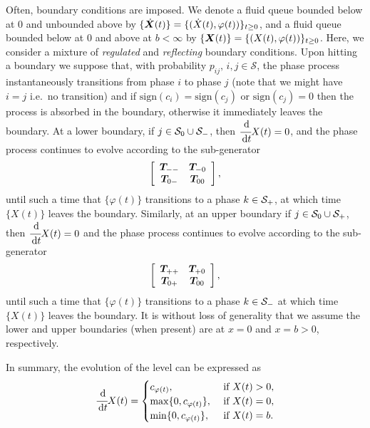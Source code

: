 Often, boundary conditions are imposed. We denote a fluid queue bounded below at \(0\) and unbounded above by \(\{\dot{\boldsymbol X}(t)\} = \{(\dot X(t),\varphi(t))\}_{t\geq0}\), and a fluid queue bounded below at \(0\) and above at \(b<\infty\) by \(\{{\boldsymbol X}(t)\} = \{( X(t),\varphi(t))\}_{t\geq0}\). Here, we consider a mixture of \emph{regulated} and \emph{reflecting} boundary conditions. Upon hitting a boundary we suppose that, with probability \(p_{ij},\,i,j\in\mathcal S\), the phase process instantaneously transitions from phase \(i\) to phase \(j\) (note that we might have \(i=j\) i.e.~no transition) and if \(\mathrm{sign}(c_i)=\mathrm{sign}(c_j)\) or \(\mathrm{sign}(c_j)=0\) then the process is absorbed in the boundary, otherwise it immediately leaves the boundary. At a lower boundary, if \(j\in\mathcal{S}_0\cup\mathcal{S}_-\), then \(\cfrac{\, \mathrm{d}}{\, \mathrm{d} t} X(t) = 0\), and the phase process continues to evolve according to the sub-generator 
\[\left[\begin{array}{cc} \boldsymbol T_{--} & \boldsymbol T_{-0} \\ \boldsymbol T_{0-} & \boldsymbol T_{00}  \end{array}\right],\]
until such a time that \(\{\varphi(t)\}\) transitions to a phase \(k\in\mathcal{S}_+\), at which time \(\{X(t)\}\) leaves the boundary. Similarly, at an upper boundary if \(j\in\mathcal{S}_0\cup\mathcal{S}_+\), then \(\cfrac{\, \mathrm{d}}{\, \mathrm{d} t} X(t) = 0\) and the phase process continues to evolve according to the sub-generator 
\[\left[\begin{array}{cc} \boldsymbol T_{++} & \boldsymbol T_{+0} \\ \boldsymbol T_{0+} & \boldsymbol T_{00}  \end{array}\right],\]
until such a time that \(\{\varphi(t)\}\) transitions to a phase \(k\in\mathcal{S}_-\) at which time \(\{X(t)\}\) leaves the boundary. It is without loss of generality that we assume the lower and upper boundaries (when present) are at \(x=0\) and \(x=b>0\), respectively.

In summary, the evolution of the level can be expressed as 
\[\cfrac{\, \mathrm{d}}{\, \mathrm{d} t} X(t) = \begin{cases} c_{\varphi(t)}, & \mbox{ if } X(t)>0, \\ \max\{0,c_{\varphi(t)}\}, & \mbox{ if } X(t)=0, \\ \min\{0,c_{\varphi(t)}\}, & \mbox{ if } X(t)=b.  \end{cases}\]

